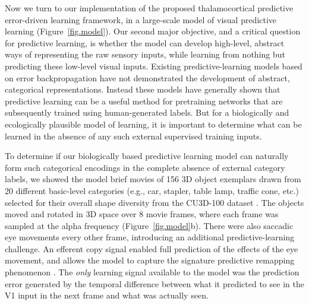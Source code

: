 \documentclass[11pt,twoside]{article}
\newif\myifpdf
\begin{document}
Now we turn to our implementation of the proposed thalamocortical predictive error-driven learning framework, in a large-scale model of visual predictive learning (Figure~\ref{fig.model}).  Our second major objective, and a critical question for predictive learning, is whether the model can develop high-level, abstract ways of representing the raw sensory inputs, while learning from nothing but predicting these low-level visual inputs.  Existing predictive-learning models based on error backpropagation \citep{LotterKreimanCox16,JakeAddOthers}
have not demonstrated the development of abstract, categorical representations.  
Instead these models have generally shown that predictive learning can be a useful method for pretraining networks that are subsequently trained using human-generated labels.  But for a biologically and ecologically plausible model of learning, it is important to determine what can be learned in the absence of any such external supervised training inputs.

To determine if our biologically based predictive learning model can naturally form such categorical encodings in the complete absence of external category labels, we showed the model brief movies of 156 3D object exemplars drawn from 20 different basic-level categories (e.g., car, stapler, table lamp, traffic cone, etc.) selected for their overall shape diversity from the CU3D-100 dataset \citep{OReillyWyatteHerdEtAl13}.  
The objects moved and rotated in 3D space over 8 movie frames, where each frame was sampled at the alpha frequency (Figure~\ref{fig.model}b).  There were also saccadic eye movements every other frame, introducing an additional predictive-learning challenge.  An efferent copy signal enabled full prediction of the effects of the eye movement, and allows the model to capture the signature predictive remapping phenomenon \citep{DuhamelColbyGoldberg92,CavanaghHuntAfrazEtAl10,NeupaneGuittonPack17}.  The \emph{only} learning signal available to the model was the prediction error generated by the temporal difference between what it predicted to see in the V1 input in the next frame and what was actually seen.
\end{document}
